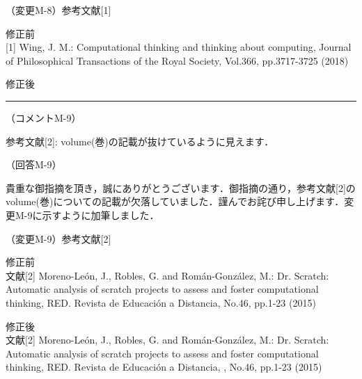 \documentclass{jarticle} %
\def\subsection#1{ \vspace{1pc} {\gt #1} }
\def\nextans{ \vspace{2pc} \hrule }
\begin{document}
\subsection{（変更M-8）参考文献[1]}
\vspace{-0.3cm}
\begin{description}
\item 修正前\\
\phantom{　}
[1] Wing, J. M.: Computational thinking and thinking about computing, Journal of Philosophical Transactions of the Royal Society, Vol.366, pp.3717-3725 (2018)
\vspace{-0.3cm}
\item 修正後\\
\phantom{　}
\textcolor{red}{}
\end{description}


\nextans
\subsection{（コメントM-9）}

参考文献[2]: volume(巻)の記載が抜けているように見えます．

\subsection{（回答M-9）}

貴重な御指摘を頂き，誠にありがとうございます．御指摘の通り，参考文献[2]のvolume(巻)についての記載が欠落していました．謹んでお詫び申し上げます．変更M-9に示すように加筆しました．

\subsection{（変更M-9）参考文献[2]}
\vspace{-0.3cm}
\begin{description}
\item 修正前\\
\phantom{　}
文献[2] Moreno-Le{\'o}n, J., Robles, G. and Rom{\'a}n-Gonz{\'a}lez, M.: Dr. Scratch: Automatic analysis of scratch projects to assess and foster computational thinking, RED. Revista de Educaci{\'o}n a Distancia, No.46, pp.1-23 (2015) 
\vspace{-0.3cm}
\item 修正後\\
\phantom{　}
文献[2] Moreno-Le{\'o}n, J., Robles, G. and Rom{\'a}n-Gonz{\'a}lez, M.: Dr. Scratch: Automatic analysis of scratch projects to assess and foster computational thinking, RED. Revista de Educaci{\'o}n a Distancia, \textcolor{red}{}, No.46, pp.1-23 (2015) 
\end{description}
\end{document}
